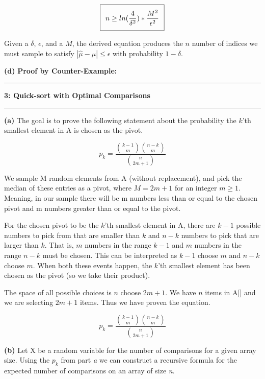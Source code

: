 \documentclass[11pt]{article}
\newcommand\question[2]{\vspace{.25in}\hrule\textbf{#1: #2}\vspace{.5em}\hrule\vspace{.10in}}
\renewcommand\part[1]{\vspace{.10in}\textbf{(#1)}}
\begin{document}
\begin{equation}
\setlength\fboxsep{0.25cm}
\setlength\fboxrule{0.4pt}
\boxed{n \geq ln(\frac{4}{\delta^2}) * \frac{M^2}{\epsilon^2}}
\end{equation}

Given a $\delta$, $\epsilon$, and a $M$, the derived equation produces the $n$ number of indices we must sample to satisfy $|\hat \mu - \mu| \leq \epsilon$ with probability $1 - \delta$.

\part{d} \textbf{Proof by Counter-Example:} 

\question{3}{Quick-sort with Optimal Comparisons}

\part{a} The goal is to prove the following statement about the probability the $k$'th smallest element in A is chosen as the pivot.

$$p_k = \frac{{k-1 \choose m} {n-k \choose m}}{{n \choose 2m+1}}$$ 

We sample M random elements from A (without replacement), and pick the median of these entries as a pivot, where $M = 2m + 1$ for an integer $m \geq 1$. Meaning, in our sample there will be m numbers less than or equal to the chosen pivot and m numbers greater than or equal to the pivot. 

For the chosen pivot to be the $k$'th smallest element in A, there are $k - 1$ possible numbers to pick from that are smaller than $k$ and $n - k$ numbers to pick that are larger than $k$. That is, $m$ numbers in the range $k - 1$ and $m$ numbers in the range $n - k$ must be chosen. This can be interpreted as $k - 1$ choose $m$ and $n - k$ choose $m$. When both these events happen, the $k$'th smallest element has been chosen as the pivot (so we take their product). 

The space of all possible choices is $n$ choose $2m + 1$. We have $n$ items in A[] and we are selecting $2m + 1$ items. Thus we have proven the equation.


$$p_k = \frac{{k-1 \choose m} {n-k \choose m}}{{n \choose 2m+1}}$$ 

\part{b} Let X be a random variable for the number of comparisons for a given array size. Using the $p_k$ from part \textit{a} we can construct a recursive formula for the expected number of comparisons on an array of size \textit{n}.
\end{document}
